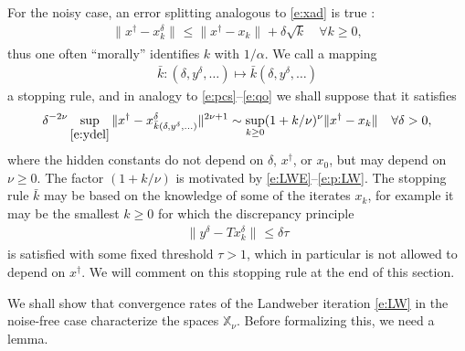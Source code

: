 \documentclass[10pt, a4paper]{iopart}
\newcommand{\IX}{\mathbb{X}}
\newcommand{\norm}[2]{     \| #1       \|_{ #2 }}
\theoremstyle{remark}
\theoremstyle{definition}
\begin{document}
For the noisy case, 
an error splitting analogous to \eqref{e:xad}
is true \cite[Lemma 6.2]{EnglHankeNeubauer1996}:
\begin{align}
\label{e:LW:es}
	\norm{ x^\dag - x_k^\delta }{}
	\leq
	\norm{ x^\dag - x_k }{}
	+
	\delta
	\sqrt{k}
	\quad
	\forall k \geq 0
	,
\end{align}
thus one often ``morally'' identifies 
$k$ with $1/\alpha$.
%
%
We call a mapping 
\begin{align}
\label{e:sr}
	\bar{k}
	:
	(\delta, y^\delta, \ldots)
	\mapsto
	\bar{k}
	(\delta, y^\delta, \ldots)
\end{align}
a stopping rule,
and
in analogy to \eqref{e:pcs}--\eqref{e:qo}
we shall suppose that
it satisfies
\begin{align}
\label{e:qok}
	\delta^{-2\nu}
	\sup_{{{\eqref{e:ydel}}}}
	\norm{x^\dag - x_{\bar{k}(\delta, y^\delta, \ldots)}^\delta}{}^{2\nu + 1}
	\sim
	\sup_{k \geq 0}
	(1 + k/\nu)^{\nu}
	\norm{x^\dag - x_k}{}
	\quad
	\forall
	\delta > 0
	,
\end{align}
where the hidden constants 
do not depend on $\delta$, $x^\dag$, or $x_0$,
but may depend on $\nu \geq 0$.
%
The factor $(1 + k/\nu)$ 
is motivated by \eqref{e:LWE}--\eqref{e:p:LW}.
%
The stopping rule $\bar{k}$ may be based 
on the knowledge of some of the iterates $x_k$,
for example 
it may be the smallest $k \geq 0$ for which
the 
discrepancy principle
\begin{align}
\label{e:MDPk}
	\norm{
		y^\delta - T x_k^\delta
	}{}
	\leq
	\delta \tau
\end{align}
is satisfied with some fixed threshold $\tau > 1$,
which in particular is not allowed to depend on $x^\dag$.
%
We will comment on this stopping rule at the end of this section.
%
%



%
We shall show that 
convergence rates of 
the Landweber iteration \eqref{e:LW}
in the noise-free case
characterize the spaces $\IX_\nu$.
%
Before formalizing this, we need a lemma.
\end{document}
